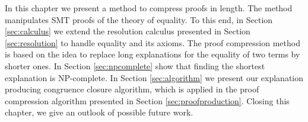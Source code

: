 
In this chapter we present a method to compress proofs in length.
The method manipulates SMT proofs of the theory of equality.
To this end, in Section \ref{sec:calculus} we extend the resolution calculus presented in Section \ref{sec:resolution} to handle equality and its axioms.
The proof compression method is based on the idea to replace long explanations for the equality of two terms by shorter ones.
In Section \ref{sec:npcomplete} show that finding the shortest explanation is NP-complete.
In Section \ref{sec:algorithm} we present our explanation producing congruence closure algorithm, which is applied in the proof compression algorithm presented in Section \ref{sec:proofproduction}.
Closing this chapter, we give an outlook of possible future work.

%

%

%







